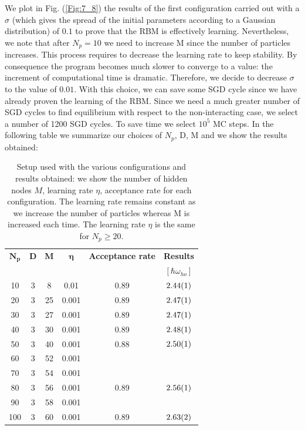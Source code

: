 We plot in Fig. (\ref{Fig:7_8}) the results of the first configuration carried out with a $\sigma$ (which gives the spread of the initial parameters according to a Gaussian distribution) of $0.1$ to prove that the RBM is effectively learning. Nevertheless, we note that after $N_p=10$ we need to increase M since the number of particles increases. This process requires to decrease the learning rate to keep stability. By consequence the program becomes much slower to converge to a value: the increment of computational time is dramatic. Therefore, we decide to decrease $\sigma$ to the value of $0.01$. With this choice, we can save some SGD cycle since we have already proven the learning of the RBM. Since we need a much greater number of SGD cycles to find equilibrium with respect to the non-interacting case, we select a number of 1200 SGD cycles. To save time we select $10^5$ MC steps. In the following table we summarize our choices of $N_p$, D, M and we show the results obtained: 


\begin{table}[H]
	\centering
	\caption{Setup used with the various configurations and results obtained: we show the number of hidden nodes $M$, learning rate $\eta$, acceptance rate for each configuration. The learning rate remains constant as we increase the number of particles whereas M is increased each time. The learning rate $\eta$ is the same for $N_p\geq20$. }
	\begin{tabular}{c c |c c c | c} 
		$\boldsymbol{N_p}$ & \textbf{D}  & \textbf{M} & $\boldsymbol{\eta}$ & \textbf{Acceptance rate} &\textbf{Results}\\  
		&&&&&$[\hbar\omega_{ho}]$\\\hline
		10 & 3 & 8 & 0.01  & 0.89 & $\SI{2.44\pm 0.01}{}$ \\
		20 & 3 & 25 & 0.001 & 0.89 & $\SI{2.47\pm 0.01}{}$\\
		30 & 3 & 27 & 0.001 & 0.89 & $\SI{2.47\pm 0.01}{}$\\
		40 & 3 & 30 & 0.001 & 0.89 & $\SI{2.48\pm 0.01}{}$\\
		50 & 3 & 40 & 0.001 & 0.88 & $\SI{2.50 \pm 0.01}{}$\\ 
		60 & 3 & 52 & 0.001 &      &                \\
		70 & 3 & 54 & 0.001 &      &                \\
		80 & 3 & 56 & 0.001 &   0.89   &  $\SI{2.56\pm0.01}{}$              \\
		90 & 3 & 58 & 0.001 &      &                \\
		100 & 3 & 60 &  0.001   &  0.89     &    $\SI{2.63\pm 0.02}{}$           \\
	\end{tabular}
	\label{Tab:4}
\end{table} 

